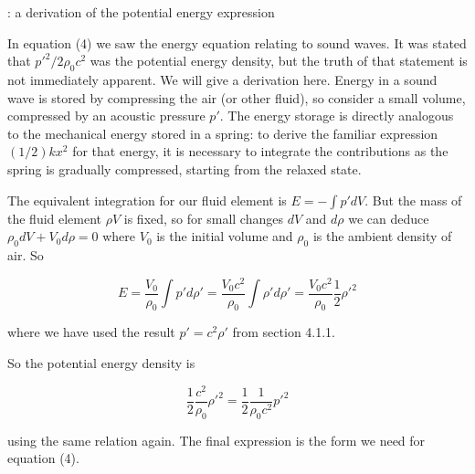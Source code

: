   : a derivation of the potential energy expression 

  In equation (4) we saw the energy equation relating to sound waves. It was 
  stated that $p'^2/2\rho_0c^2$ was the potential energy density, but the truth 
  of that statement is not immediately apparent. We will give a derivation 
  here. Energy in a sound wave is stored by compressing the air (or other 
  fluid), so consider a small volume, compressed by an acoustic pressure $p'$. 
  The energy storage is directly analogous to the mechanical energy stored in a 
  spring: to derive the familiar expression $(1/2)kx^2$ for that energy, it is 
  necessary to integrate the contributions as the spring is gradually 
  compressed, starting from the relaxed state. 

  The equivalent integration for our fluid element is $E=-\int{p' dV}$. But the 
  mass of the fluid element $\rho V$ is fixed, so for small changes $dV$ and $d 
  \rho$ we can deduce $\rho_0 dV + V_0 d\rho =0$ where $V_0$ is the initial 
  volume and $\rho_0$ is the ambient density of air. So 

  $$E=\dfrac{V_0}{\rho_0}\int{p' d\rho'}=\dfrac{V_0 c^2}{\rho_0}\int{\rho' 
  d\rho'}=\dfrac{V_0 c^2}{\rho_0}\dfrac{1}{2}\rho'^2 \tag{15}$$ 

  where we have used the result $p'=c^2 \rho'$ from section 4.1.1. 

  So the potential energy density is 

  $$\dfrac{1}{2}\dfrac{c^2}{\rho_0}\rho'^2 = \dfrac{1}{2}\dfrac{1}{\rho_0 
  c^2}p'^2 \tag{16}$$ 

  using the same relation again. The final expression is the form we need for 
  equation (4). 
